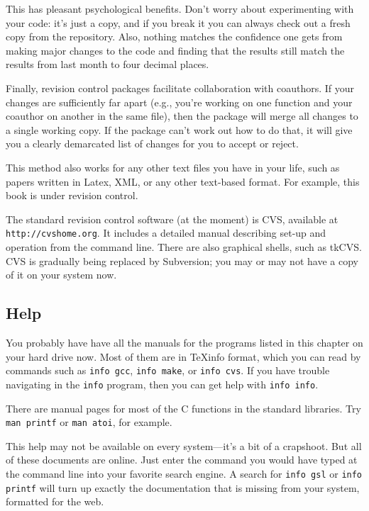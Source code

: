 \documentclass[12pt]{article}
\begin{document}
This has pleasant psychological benefits. Don't worry about experimenting
with your code: it's just a copy, and if you break it you can always check
out a fresh copy from the repository. Also, nothing matches the confidence
one gets from making major changes to the code and finding that the
results still match the results from last month to four decimal places.


Finally, revision control packages facilitate collaboration with
coauthors. If your changes are sufficiently far apart (e.g., you're
working on one function and your coauthor on another in the same file),
then the package will merge all changes to a single working copy. If
the package can't work out how to do that, it will give you a clearly
demarcated list of changes for you to accept or reject.

This method also works for any other text files you have in your
life, such as papers written in Latex, XML, or any other text-based
format. For example, this book is under revision control.

The standard revision control software (at the moment) is CVS, available at {\tt
http://cvshome.org}. It includes a detailed manual describing set-up and
operation from the command line. There are also graphical shells, such as tkCVS.
CVS is gradually being replaced by Subversion; you may or may not have a copy of
it on your system now.

\subsection{Help} 
You probably have have all the manuals for the programs listed in this
chapter on your hard drive now. Most of them are in \TeX info format,
which you can read by commands such as {\tt info gcc}, {\tt info make},
or {\tt info cvs}. If you have trouble navigating in the {\tt info}
program, then you can get help with {\tt info info}.

There are manual pages for most of the C functions in the standard libraries. Try
{\tt man printf} or {\tt man atoi}, for example.

This help may not be available on every system---it's a bit of
a crapshoot. But all of these documents are online. Just enter the
command you would have typed at the command line into your favorite
search engine. A search for {\tt info gsl} or {\tt info printf} will
turn up exactly the documentation that is missing from your system,
formatted for the web.
\end{document}
